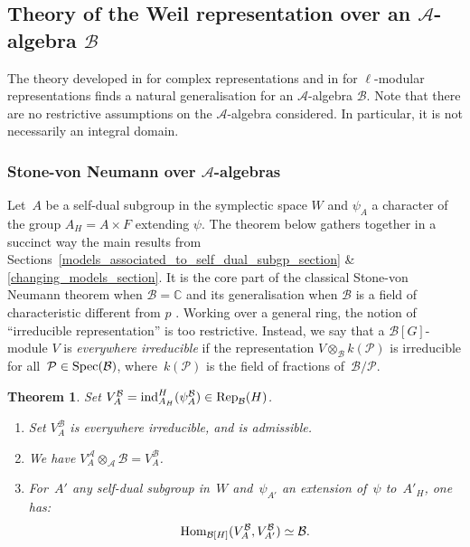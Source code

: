 \documentclass[11pt]{article}
\theoremstyle{plain}
\theoremstyle{definition}
\theoremstyle{plain}
\theoremstyle{definition}
\theoremstyle{plain}
\newtheorem{theorem}{Theorem}
\begin{document}
\subsection{Theory of the Weil representation over an $\mathcal{A}$-algebra $\mathcal{B}$}

The theory developed in \cite[Chap. 2]{mvw} for complex representations and in \cite{trias_theta1} for $\ell$-modular representations finds a natural generalisation for an $\mathcal{A}$-algebra $\mathcal{B}$. Note that there are no restrictive assumptions on the $\mathcal{A}$-algebra considered. In particular, it is not necessarily an integral domain.

\subsubsection*{Stone-von Neumann over $\mathcal{A}$-algebras} 

Let~$A$ be a self-dual subgroup in the symplectic space $W$ and $\psi_A$ a character of the group $A_H=A\times F$ extending $\psi$. The theorem below gathers together in a succinct way the main results from Sections~\ref{models_associated_to_self_dual_subgp_section} \& \ref{changing_models_section}. It is the core part of the classical Stone-von Neumann theorem when $\mathcal{B}=\mathbb{C}$ \cite[Chap. 2, Th. I.2]{mvw} and its generalisation when $\mathcal{B}$ is a field of characteristic different from $p$ \cite[Th. 2.1]{trias_theta1}. Working over a general ring, the notion of ``irreducible representation'' is too restrictive. Instead, we say that a $\mathcal{B}[G]$-module $V$ is \emph{everywhere irreducible} if the representation $V \otimes_\mathcal{B} k(\mathcal{P})$ is irreducible for all~$\mathcal{P} \in \textup{Spec}(\mathcal{B})$, where~$k(\mathcal P)$ is the field of fractions of~$\mathcal B/\mathcal P$. 

\begin{theorem} \label{metaplectic_reps_first_thm} %
Set $V_A^\mathcal{B} = \textup{ind}_{A_H}^H(\psi_A^\mathcal{B}) \in \textup{Rep}_\mathcal{B}(H)$.
\begin{enumerate}[label=\textup{\alph*)}]
\item \label{everywhere_irreducible_point} Set $V_A^\mathcal{B}$ is everywhere irreducible, and is admissible.
\item \label{extension_scalar_point} We have $V_A^{\mathcal{A}} \otimes_\mathcal{A} \mathcal{B} = V_A^\mathcal{B}$.
\item \label{changing_models_point} For~$A'$ any self-dual subgroup in~$W$ and~$\psi_{A'}$ an extension of~$\psi$ to~$A'_H$, one has:
$$\textup{Hom}_{\mathcal{B}[H]}(V_A^\mathcal{B}, V_{A'}^\mathcal{B}) \simeq \mathcal{B}.$$
\end{enumerate} \end{theorem}
\end{document}
